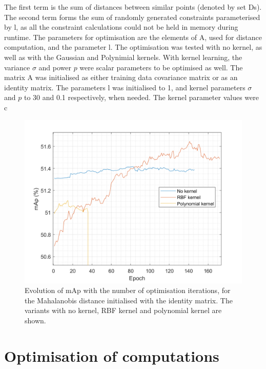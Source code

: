 \documentclass[10pt,technote]{IEEEtran}
\begin{document}
The first term is the sum of distances between similar points (denoted by set Ds). The second term forms the sum of randomly generated constraints parameterised by l, as all the constraint calculations could not be held in memory during runtime. The parameters for optimisation are the elements of A, used for distance computation, and the parameter l. The optimisation was tested with no kernel, as well as with the Gaussian and Polynimial kernels. With kernel learning, the variance $\sigma$ and power $p$ were scalar parameters to be optimised as well. The matrix A was initialised as either training data covariance matrix or as an identity matrix. The parameters l was initialised to 1, and kernel parameters $\sigma$ and $p$ to 30 and 0.1 respectively, when needed. The kernel parameter values were c

\begin{figure}
    \centering
    \includegraphics[width=\linewidth]{Graphs/I_init_comparison.png}
    \caption{Evolution of mAp with the number of optimisation iterations, for the Mahalanobis distance initialised with the identity matrix. The variants with no kernel, RBF kernel and polynomial kernel are shown.}
    \label{fig:comparison_I_init}
\end{figure}

\appendices

\section{Optimisation of computations}
\end{document}
